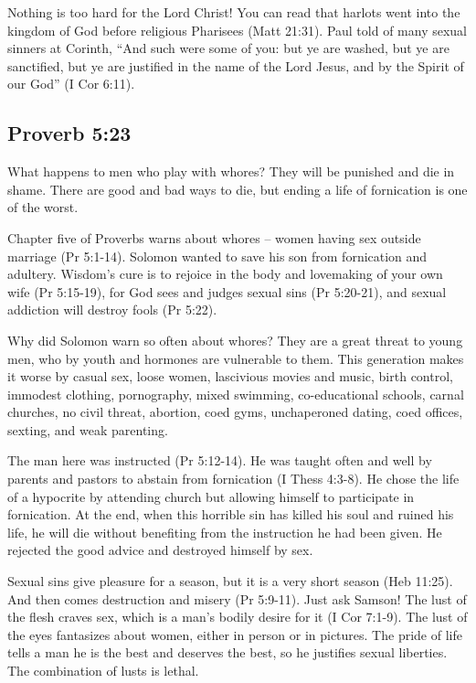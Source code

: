Nothing is too hard for the Lord Christ! You can read that harlots went into the kingdom of God before religious Pharisees (Matt 21:31). Paul told of many sexual sinners at Corinth, “And such were some of you: but ye are washed, but ye are sanctified, but ye are justified in the name of the Lord Jesus, and by the Spirit of our God” (I Cor 6:11).

\subsection{Proverb 5:23}
What happens to men who play with whores? They will be punished and die in shame. There are good and bad ways to die, but ending a life of fornication is one of the worst.

Chapter five of Proverbs warns about whores – women having sex outside marriage (Pr 5:1-14). Solomon wanted to save his son from fornication and adultery. Wisdom’s cure is to rejoice in the body and lovemaking of your own wife (Pr 5:15-19), for God sees and judges sexual sins (Pr 5:20-21), and sexual addiction will destroy fools (Pr 5:22). 

Why did Solomon warn so often about whores? They are a great threat to young men, who by youth and hormones are vulnerable to them. This generation makes it worse by casual sex, loose women, lascivious movies and music, birth control, immodest clothing, pornography, mixed swimming, co-educational schools, carnal churches, no civil threat, abortion, coed gyms, unchaperoned dating, coed offices, sexting, and weak parenting.

The man here was instructed (Pr 5:12-14). He was taught often and well by parents and pastors to abstain from fornication (I Thess 4:3-8). He chose the life of a hypocrite by attending church but allowing himself to participate in fornication. At the end, when this horrible sin has killed his soul and ruined his life, he will die without benefiting from the instruction he had been given. He rejected the good advice and destroyed himself by sex.

Sexual sins give pleasure for a season, but it is a very short season (Heb 11:25). And then comes destruction and misery (Pr 5:9-11). Just ask Samson! The lust of the flesh craves sex, which is a man’s bodily desire for it (I Cor 7:1-9). The lust of the eyes fantasizes about women, either in person or in pictures. The pride of life tells a man he is the best and deserves the best, so he justifies sexual liberties. The combination of lusts is lethal. 

